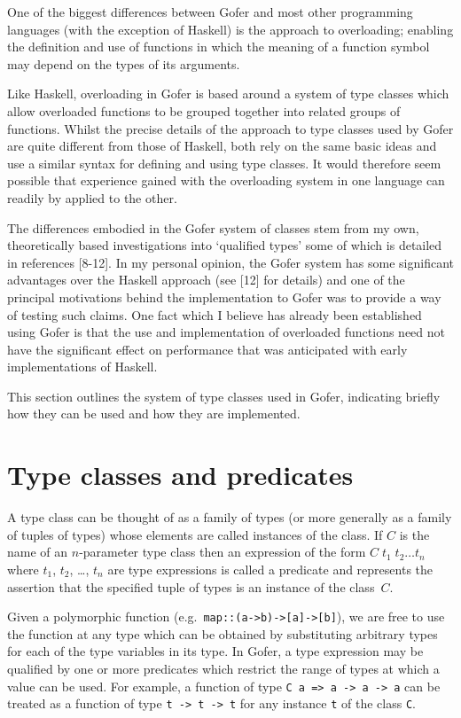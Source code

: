 One of the biggest differences between Gofer and most other programming
languages  (with  the  exception  of  Haskell)  is  the   approach   to
overloading; enabling the definition and use of functions in which  the
meaning of a function symbol may depend on the types of its arguments.

Like Haskell, overloading in Gofer is based around  a  system  of  type
classes which allow overloaded functions to be  grouped  together  into
related groups  of  functions.   Whilst  the  precise  details  of  the
approach to type classes used by Gofer are quite different from those  of
Haskell, both rely on the same basic ideas and use a similar syntax for
defining and using type classes.  It would therefore seem possible that
experience gained with the  overloading  system  in  one  language  can
readily by applied to the other.

The differences embodied in the Gofer system of classes  stem  from  my
own, theoretically based investigations into `qualified types' some  of
which is detailed in references [8-12].  In my  personal  opinion,  the
Gofer system has some significant advantages over the Haskell  approach
(see [12] for details) and one of the principal motivations behind  the
implementation to Gofer was to provide a way of  testing  such  claims.
One fact which I believe has already been established  using  Gofer  is
that the use and implementation of overloaded functions need  not  have
the significant effect on performance that was anticipated  with  early
implementations of Haskell.

This section outlines  the  system  of  type  classes  used  in  Gofer,
indicating briefly how they can be used and how they are implemented.


\section{Type classes and predicates}
A type class can be thought of as a family of types (or more  generally
as a family of tuples of types) whose elements are called instances  of
the class.  If $C$ is the name of  an  $n$-parameter  type  class  then  an
expression of the form $C\; t_1\; t_2 \dots t_n$
where $t_1$, $t_2$, \dots,  $t_n$  are  type
expressions is called a predicate and represents the assertion that the
specified tuple of types is an instance of the class~$C$.

Given a polymorphic function (e.g.\ \verb"map::(a->b)->[a]->[b]"), we are  free
to use the function at any type which can be obtained  by  substituting
arbitrary types for each of the type variables in its type.  In  Gofer,
a type expression may be qualified by  one  or  more  predicates  which
restrict the range of types at which a value can be used.
For example, a function of type 
\verb"C a => a -> a -> a" can be treated as a function
of type \verb"t -> t -> t" for any instance \verb"t" of the class \verb"C".

